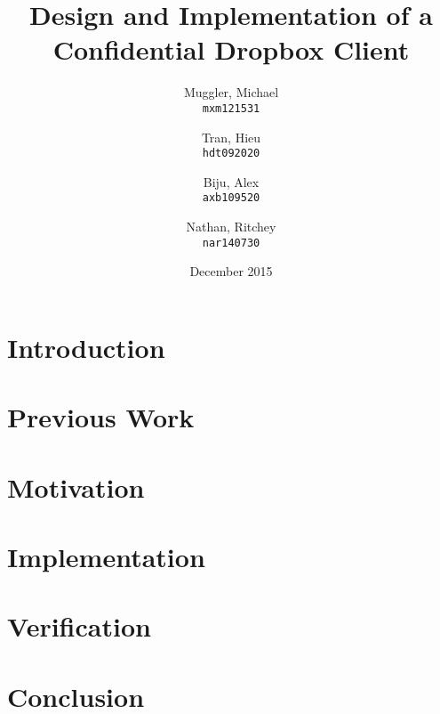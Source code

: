 \documentclass[11pt]{article}
\title{Design and Implementation of a Confidential Dropbox Client}
\author{
  Muggler, Michael\\
  \texttt{mxm121531}
  \and
  Tran, Hieu\\
  \texttt{hdt092020}
  \and
  Biju, Alex\\
  \texttt{axb109520}
  \and
  Nathan, Ritchey\\
  \texttt{nar140730}
}
\date{December 2015}
\begin{document}
\maketitle

\section{Introduction}

\section{Previous Work}

\section{Motivation}

\section{Implementation}

\section{Verification}

\section{Conclusion}
\end{document}
